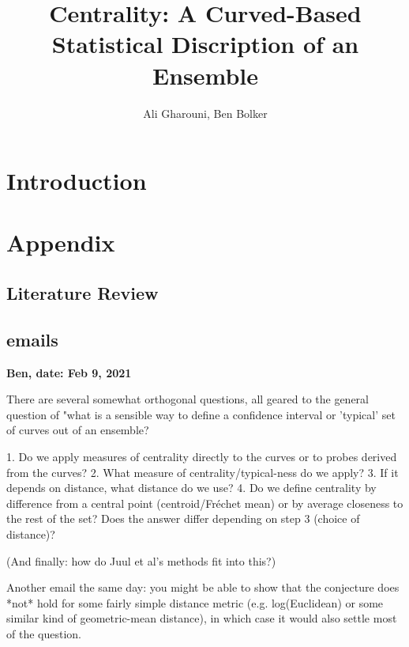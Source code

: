 \documentclass[12pt]{article}
\title{Centrality: A Curved-Based Statistical Discription of an Ensemble}
\author{Ali Gharouni, Ben Bolker}
\theoremstyle{definition} %
\begin{document}
\maketitle
\linenumbers

\section{Introduction}



\section{Appendix}

\subsection{Literature Review}
\citep{juul2021fixed}

\subsection{emails}

{\bf Ben,  
date: Feb 9, 2021}

There are several somewhat orthogonal questions, all geared to the general question of "what is a sensible way to define a confidence interval or 'typical' set of curves out of an ensemble?

 1. Do we apply measures of centrality directly to the curves or to
probes derived from the curves?
 2.  What measure of centrality/typical-ness do we apply?
 3.  If it depends on distance, what distance do we use?
 4. Do we define centrality by difference from a central point
(centroid/Fréchet mean) or by average closeness to the rest of the
set? Does the answer differ depending on step 3 (choice of distance)?

(And finally: how do Juul et al's methods fit into this?)

Another email the same day:
you might be able to show that the conjecture does *not* hold for some fairly simple distance metric (e.g. log(Euclidean) or some similar kind of geometric-mean distance), in which case it would also settle most of the question.
\end{document}
